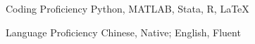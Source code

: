 \documentclass{resume} %
\begin{document}






\begin{rSection}{Coding Proficiency}
Python, MATLAB, Stata, R, \LaTeX 

\end{rSection}


\begin{rSection}{Language Proficiency} 
Chinese, Native; English, Fluent

\end{rSection}

  

\end{document}
